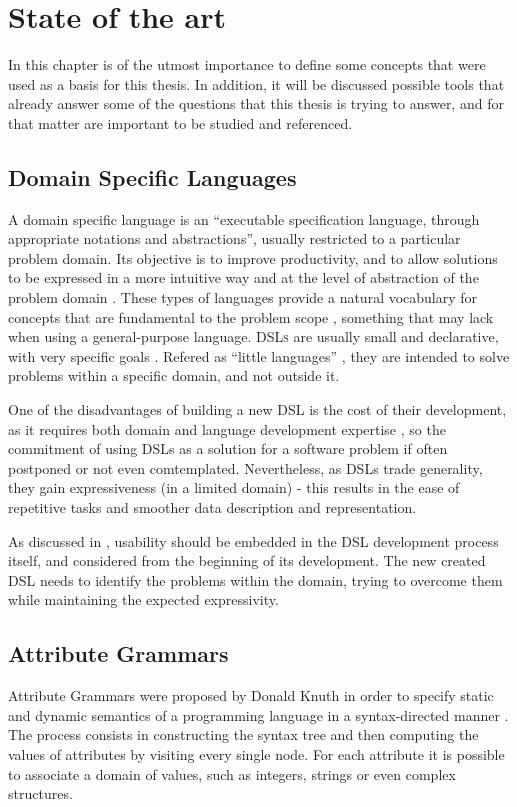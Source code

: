 \chapter{State of the art} \label{state_of_the_art}

In this chapter is of the utmost importance to define some concepts that were used as a basis for this thesis. 
In addition, it will be discussed possible tools that already answer some of the questions that this thesis is trying to answer, and for that matter are important to be studied and referenced.
	
\section{Domain Specific Languages}
A domain specific language is an ``executable specification language, through appropriate notations and abstractions'', usually restricted to a particular problem domain. 
Its objective is to improve productivity, and to allow solutions to be expressed in a more intuitive way and at the level of abstraction of the problem domain \cite{van_2000}.
These types of languages provide a natural vocabulary for concepts that are fundamental to the problem scope \cite{bruce_1997}, something that may lack when using a general-purpose language. 
\textsc{DSLs} are usually small and declarative, with very specific goals \cite{van_2000}.
Refered as ``little languages'' \cite{bentley_1986}, they are intended to solve problems within a specific domain, and not outside it.

One of the disadvantages of building a new \textsc{DSL} is the cost of their development, as it requires both domain and language development expertise \cite{kosar_2008},
so the commitment of using \textsc{DSL}s as a solution for a software problem if often postponed or not even comtemplated.
Nevertheless, as \textsc{DSL}s trade generality, they gain expressiveness (in a limited domain) - this results in the ease of repetitive tasks and smoother data
description \cite{mernik_2005} and representation.

As discussed in \cite{barisic_2012}, usability should be embedded in the \textsc{DSL} development process itself, and considered from the beginning of its development.
The new created \textsc{DSL} needs to identify the problems within the domain, trying to overcome them while maintaining the expected expressivity.


\section{Attribute Grammars}
Attribute Grammars were proposed by Donald Knuth in order to specify static and dynamic semantics of a programming language in a syntax-directed manner \cite{thirunarayan_2009}. 
The process consists in constructing the syntax tree and then computing the values of attributes by visiting every single node. 
For each attribute it is possible to associate a domain of values, such as integers, strings or even complex structures. 

